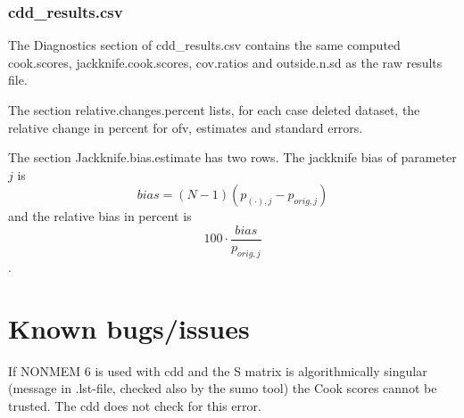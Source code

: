 \subsubsection*{cdd\_results.csv}
The Diagnostics section of cdd\_results.csv contains the same computed cook.scores, jackknife.cook.scores, cov.ratios and
outside.n.sd as the raw results file.

The section relative.changes.percent lists, for each case deleted dataset, the relative change in percent
for ofv, estimates and standard errors.

The section Jackknife.bias.estimate has two rows. The jackknife bias of parameter $j$ is \[bias=\left(N-1\right)\left(p_{(\cdot),j}-p_{orig,j}\right) \]
and the relative bias in percent is \[100\cdot\frac{bias}{p_{orig,j}}\].

\section{Known bugs/issues}

If NONMEM 6 is used with cdd and the S matrix is algorithmically singular (message in .lst-file, checked also by the sumo tool) the Cook scores cannot be trusted. The cdd does not check for this error. 


